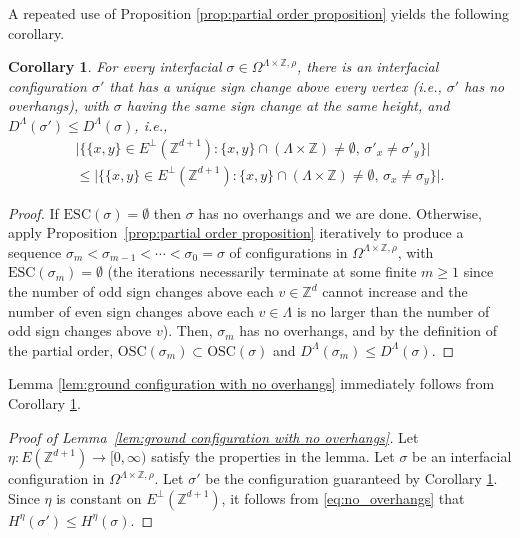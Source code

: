 \documentclass[11pt, reqno]{amsart}
\newtheorem{corollary}[theorem]{Corollary}
\newcommand{\Z}{\mathbb{Z}}
\newcommand{\osc}{\text{OSC}}
\newcommand{\esc}{\text{ESC}}
\numberwithin{equation}{section}
\begin{document}
A repeated use of Proposition \ref{prop:partial order proposition} yields the following corollary.

\begin{corollary}\label{cor:no_overhangs}
For every interfacial $\sigma\in\Omega^{\Lambda\times\Z,\rho}$, there is an interfacial configuration $\sigma'$ that has a unique sign change above every vertex (i.e., $\sigma'$ has no overhangs), with $\sigma$ having the same sign change at the same height, and $D^\Lambda(\sigma')\le D^\Lambda(\sigma)$, i.e.,
\begin{multline}\label{eq:no_overhangs}
\lvert\{\{x,y\}\in E^{\perp}(\Z^{d+1}) \colon \{x,y\}\cap(\Lambda\times \Z)\neq\emptyset,\, \sigma'_x\neq\sigma'_y\}\rvert\\
\leq \lvert\{\{x,y\}\in E^{\perp}(\Z^{d+1}) \colon \{x,y\}\cap(\Lambda\times \Z)\neq\emptyset,\, \sigma_x\neq\sigma_y\}\rvert.
\end{multline}  
\end{corollary}

\begin{proof}
If $\esc(\sigma)=\emptyset$ then $\sigma$ has no overhangs and we are done. Otherwise, apply Proposition~\ref{prop:partial order proposition} iteratively to produce a sequence $\sigma_m<\sigma_{m-1}<\cdots<\sigma_0 = \sigma$ of configurations in $\Omega^{\Lambda\times\Z,\rho}$, with $\esc(\sigma_m)=\emptyset$ (the iterations necessarily terminate at some finite $m\ge 1$ since the number of odd sign changes above each $v\in\Z^d$ cannot increase and the number of even sign changes above each $v\in\Lambda$ is no larger than the number of odd sign changes above $v$). 
Then, $\sigma_m$ has no overhangs, and by the definition of the partial order, $\osc(\sigma_m)\subset\osc(\sigma)$ and $D^\Lambda(\sigma_m)\le D^\Lambda(\sigma)$. 
\end{proof}

Lemma \ref{lem:ground configuration with no overhangs} immediately follows from Corollary \ref{cor:no_overhangs}.

\begin{proof}[Proof of Lemma~\ref{lem:ground configuration with no overhangs}]
Let $\eta\colon E(\Z^{d+1})\to[0,\infty)$ satisfy the properties in the lemma. Let $\sigma$ be an interfacial configuration in $\Omega^{\Lambda\times\Z,\rho}$. 
Let $\sigma'$ be the configuration guaranteed by  Corollary \ref{cor:no_overhangs}.
Since $\eta$ is constant on $E^{\perp}(\Z^{d+1})$, 
it follows from \eqref{eq:no_overhangs} 
that $H^\eta(\sigma')\le H^\eta(\sigma)$. 
\end{proof}
\end{document}
